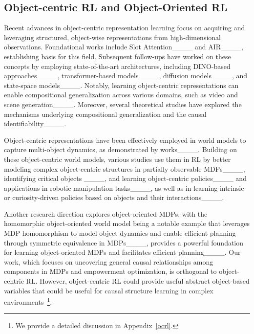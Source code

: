 \vspace{-1mm}
\subsection{Object-centric RL and Object-Oriented RL}
\vspace{-2mm}
Recent advances in object-centric representation learning focus on acquiring and leveraging structured, object-wise representations from high-dimensional observations. Foundational works include Slot Attention____ and AIR____, establishing basis for this field. Subsequent follow-ups have worked on these concepts by employing state-of-the-art architectures, including DINO-based approaches____, transformer-based models____, diffusion models____, and state-space models____. Notably, learning object-centric representations can enable compositional generalization across various domains, such as video and scene generation____. Moreover, several theoretical studies have explored the mechanisms underlying compositional generalization and the causal identifiability____.

Object-centric representations have been effectively employed in world models to capture multi-object dynamics, as demonstrated by works____. Building on these object-centric world models, various studies use them in RL by better modeling complex object-centric structures in partially observable MDPs____, identifying critical objects ____, and learning object-centric policies____ and applications in robotic manipulation tasks____, as well as in learning intrinsic or curiosity-driven policies based on objects and their interactions____. 

Another research direction explores object-oriented MDPs, with the homomorphic object-oriented world model being a notable example that leverages MDP homomorphism to model object dynamics and enable efficient planning through symmetric equivalence in MDPs____, provides a powerful foundation for learning object-oriented MDPs and facilitates efficient planning____.   Our work, which focuses on uncovering general causal relationships among components in MDPs and empowerment optimization, is orthogonal to object-centric RL. However, object-centric RL could provide useful abstract object-based variables that could be useful for causal structure learning in complex environments~\footnote{We provide a detailed discussion in Appendix~\ref{ocrl}.}.

\vspace{-2mm}